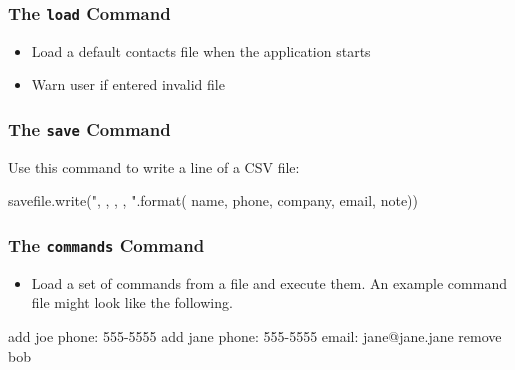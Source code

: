 \documentclass[11pt]{cselabheader}
\begin{document}
\subsubsection{The \texttt{load} Command}
\begin{itemize}
\item Load a default contacts file when the application starts
\item Warn user if entered invalid file
\end{itemize}

\subsubsection{The \texttt{save} Command}
Use this command to write a line of a CSV file:
\begin{python3code}
savefile.write("{}, {}, {}, {}, {}\n".format(
    name, phone, company, email, note))
\end{python3code}

\subsubsection{The \texttt{commands} Command}
\begin{itemize}
\item Load a set of commands from a file and execute them. An example command file
might look like the following.
\end{itemize}

\begin{verbatimcode}
add joe
phone: 555-5555
add jane
phone: 555-5555
email: jane@jane.jane
remove bob
\end{verbatimcode}
\end{document}

